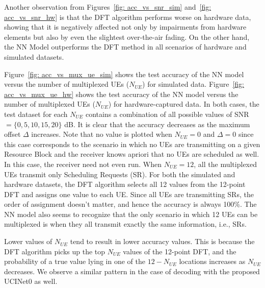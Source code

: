 \documentclass[journal]{IEEEtran}
\begin{document}
Another observation from Figures~\ref{fig: acc_vs_snr_sim} and~\ref{fig: acc_vs_snr_hw} is that the DFT algorithm performs worse on hardware data, showing that it is negatively affected not only by impairments from hardware elements but also by even the slightest over-the-air fading. On the other hand, the NN Model outperforms the DFT method in all scenarios of hardware and simulated datasets.

Figure~\ref{fig: acc_vs_mux_ue_sim} shows the test accuracy of the NN model versus the number of multiplexed UEs ($N_{UE}$) for simulated data. Figure~\ref{fig: acc_vs_mux_ue_hw} shows the test accuracy of the NN model versus the number of multiplexed UEs ($N_{UE}$) for hardware-captured data. In both cases, the test dataset for each $N_{UE}$ contains a combination of all possible values of SNR $= \{0, 5, 10, 15, 20\}$ dB. It is clear that the accuracy decreases as the maximum offset $\Delta$ increases. Note that no value is plotted when $N_{UE} = 0$ and $\Delta=0$ since this case corresponds to the scenario in which no UEs are transmitting on a given Resource Block and the receiver knows apriori that no UEs are scheduled as well. In this case, the receiver need not even run. When $N_{UE} = 12$, all the multiplexed UEs transmit only Scheduling Requests (SR). For both the simulated and hardware datasets, the DFT algorithm selects all 12 values from the 12-point DFT and assigns one value to each UE. Since all UEs are transmitting SRs, the order of assignment doesn't matter, and hence the accuracy is always 100\%. The NN model also seems to recognize that the only scenario in which 12 UEs can be multiplexed is when they all transmit exactly the same information, i.e., SRs. 

Lower values of $N_{UE}$ tend to result in lower accuracy values. This is because the DFT algorithm picks up the top $N_{UE}$ values of the 12-point DFT, and the probability of a true value lying in one of the $12-N_{UE}$ locations increases as $N_{UE}$ decreases. We observe a similar pattern in the case of decoding with the proposed UCINet0 as well.
\end{document}
